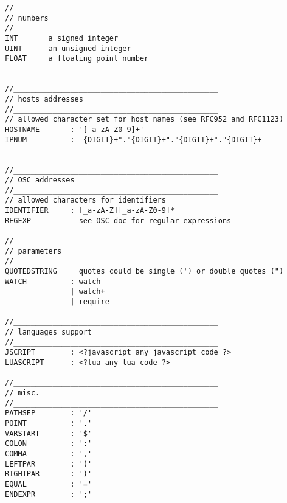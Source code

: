 \begin{verbatim}
//_______________________________________________
// numbers
//_______________________________________________
INT       a signed integer
UINT      an unsigned integer
FLOAT     a floating point number


//_______________________________________________
// hosts addresses
//_______________________________________________
// allowed character set for host names (see RFC952 and RFC1123)
HOSTNAME       : '[-a-zA-Z0-9]+' 
IPNUM          :  {DIGIT}+"."{DIGIT}+"."{DIGIT}+"."{DIGIT}+


//_______________________________________________
// OSC addresses
//_______________________________________________
// allowed characters for identifiers
IDENTIFIER     : [_a-zA-Z][_a-zA-Z0-9]*
REGEXP           see OSC doc for regular expressions

//_______________________________________________
// parameters
//_______________________________________________
QUOTEDSTRING     quotes could be single (') or double quotes (")
WATCH          : watch
               | watch+
               | require

//_______________________________________________
// languages support
//_______________________________________________
JSCRIPT        : <?javascript any javascript code ?>
LUASCRIPT      : <?lua any lua code ?>

//_______________________________________________
// misc.
//_______________________________________________
PATHSEP        : '/'
POINT          : '.'
VARSTART       : '$'
COLON          : ':'
COMMA          : ','
LEFTPAR        : '('
RIGHTPAR       : ')'
EQUAL          : '='
ENDEXPR        : ';'
\end{verbatim}
